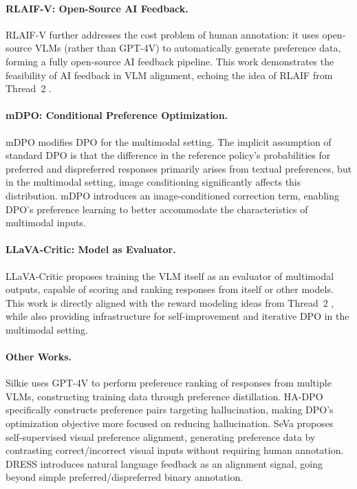 \paragraph{RLAIF-V: Open-Source AI Feedback.}
RLAIF-V \cite{yu2024rlaifv} further addresses the cost problem of human annotation:
it uses open-source VLMs (rather than GPT-4V) to automatically generate preference data,
forming a fully open-source AI feedback pipeline.
This work demonstrates the feasibility of AI feedback in VLM alignment,
echoing the idea of RLAIF \cite{lee2023rlaif} from Thread~2
.

\paragraph{mDPO: Conditional Preference Optimization.}
mDPO \cite{wang2024mdpo} modifies DPO for the multimodal setting.
The implicit assumption of standard DPO is that the difference in the reference policy's probabilities
for preferred and dispreferred responses primarily arises from textual preferences,
but in the multimodal setting, image conditioning significantly affects this distribution.
mDPO introduces an image-conditioned correction term,
enabling DPO's preference learning to better accommodate the characteristics of multimodal inputs.

\paragraph{LLaVA-Critic: Model as Evaluator.}
LLaVA-Critic \cite{xiong2024llava-critic} proposes training the VLM itself as an evaluator of multimodal outputs,
capable of scoring and ranking responses from itself or other models.
This work is directly aligned with the reward modeling ideas from Thread~2
,
while also providing infrastructure for self-improvement and iterative DPO in the multimodal setting.

\paragraph{Other Works.}
Silkie \cite{li2023silkie} uses GPT-4V to perform preference ranking of responses from multiple VLMs,
constructing training data through preference distillation.
HA-DPO \cite{zhao2023hadpo} specifically constructs preference pairs targeting hallucination,
making DPO's optimization objective more focused on reducing hallucination.
SeVa \cite{zhu2024seva} proposes self-supervised visual preference alignment,
generating preference data by contrasting correct/incorrect visual inputs without requiring human annotation.
DRESS \cite{chen2023dress} introduces natural language feedback as an alignment signal,
going beyond simple preferred/dispreferred binary annotation.

